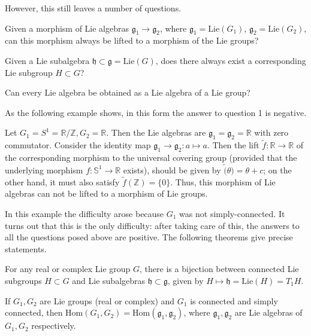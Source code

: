 \documentclass{report}
\begin{document}
However, this still leaves a number of questions.
\begin{question}
    Given a morphism of Lie algebras $\mathfrak{g}_1 \to \mathfrak{g}_2$, where $\mathfrak{g}_1 = \text{Lie}(G_1)$, $\mathfrak{g}_2 = \text{Lie}(G_2)$, can this morphism always be lifted to a morphism of the Lie groups?
\end{question}
\begin{question}
    Given a Lie subalgebra $\mathfrak{h} \subset \mathfrak{g} = \text{Lie}(G)$, does there always exist a corresponding Lie subgroup $H \subset G$?
\end{question}
\begin{question}
    Can every Lie algebra be obtained as a Lie algebra of a Lie group?
\end{question}

As the following example shows, in this form the answer to question 1 is negative.

\begin{example}
Let $G_1 = S^1 = \mathbb{R}/\mathbb{Z}, G_2 = \mathbb{R}$. Then the Lie algebras are $\mathfrak{g}_1 = \mathfrak{g}_2 = \mathbb{R}$ with zero commutator. Consider the identity map $\mathfrak{g}_1 \to \mathfrak{g}_2 : a \mapsto a$. Then the lift $\tilde f: \mathbb R \to \mathbb R$ of the corresponding morphism to the universal covering group (provided that the underlying morphism $f: \mathbb S^1 \to \mathbb R$ exists), should be given by $\tilde(\theta) = \theta + c$; on the other hand, it must also satisfy $\tilde f(\mathbb{Z}) = \{0\}$. Thus, this morphism of Lie algebras can not be lifted to a morphism of Lie groups.
\end{example}

In this example the difficulty arose because $G_1$ was not simply-connected. It turns out that this is the only difficulty: after taking care of this, the answers to all the questions posed above are positive. The following theorems give precise statements.

\begin{theorem}
For any real or complex Lie group $G$, there is a bijection between connected Lie subgroups $H \subset G$ and Lie subalgebras $\mathfrak{h} \subset \mathfrak{g}$, given by $H \mapsto \mathfrak{h} = \text{Lie}(H) = T_1 H$.
\end{theorem}

\begin{theorem}
If $G_1, G_2$ are Lie groups (real or complex) and $G_1$ is connected and simply connected, then $\text{Hom}(G_1, G_2) = \text{Hom}(\mathfrak{g}_1, \mathfrak{g}_2)$, where $\mathfrak{g}_1, \mathfrak{g}_2$ are Lie algebras of $G_1, G_2$ respectively.
\end{theorem}
\end{document}
